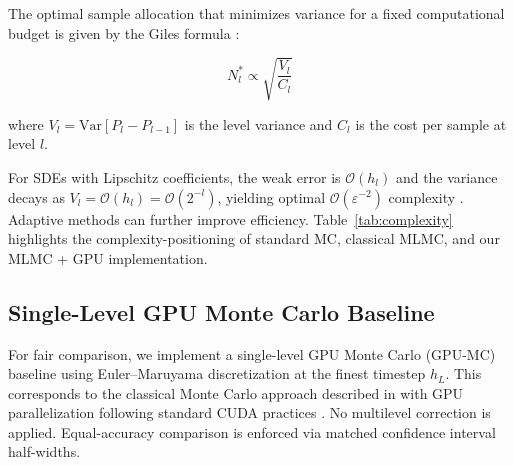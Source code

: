\documentclass{ieeeaccess}
\begin{document}
The optimal sample allocation that minimizes variance for a fixed computational budget is given
by the Giles formula \cite{giles2015multilevel}:

\begin{equation}
    N_l^* \propto \sqrt{\frac{V_l}{C_l}}
    \label{eq:giles}
\end{equation}

\noindent where $V_l = \text{Var}[P_l - P_{l-1}]$ is the level variance and $C_l$ is the cost
per sample at level $l$.

For SDEs with Lipschitz coefficients, the weak error is $\mathcal{O}(h_l)$ and the variance
decays as $V_l = \mathcal{O}(h_l) = \mathcal{O}(2^{-l})$, yielding optimal
$\mathcal{O}(\varepsilon^{-2})$ complexity \cite{giles2015multilevel, higham2015}. Adaptive
methods \cite{collier2015} can further improve efficiency.
Table~\ref{tab:complexity} highlights the complexity-positioning of standard MC, classical MLMC,
and our MLMC + GPU implementation.

\begin{table}[t]
\caption{Algorithmic Complexity Comparison for Stochastic SDE Simulation}
\label{tab:complexity}
\centering
{}
\end{table}

\subsection{Single-Level GPU Monte Carlo Baseline}

For fair comparison, we implement a single-level GPU Monte Carlo (GPU-MC) baseline using
Euler--Maruyama discretization at the finest timestep $h_L$. This corresponds to the classical
Monte Carlo approach described in \cite{glasserman2003monte} with GPU parallelization following
standard CUDA practices \cite{nvidia2020cuda, owens2008, harris2007}. No multilevel correction
is applied. Equal-accuracy comparison is enforced via matched confidence interval half-widths.
\end{document}
